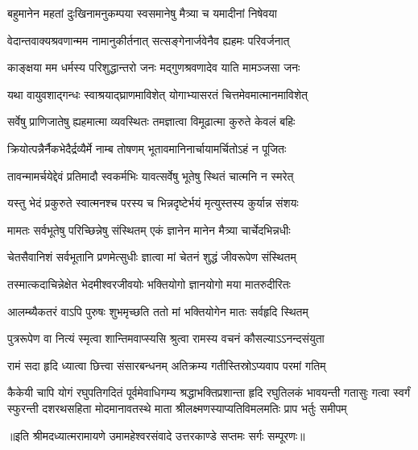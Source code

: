 \twolineshloka
{बहुमानेन महतां दुःखिनामनुकम्पया}
{स्वसमानेषु मैत्र्या च यमादीनां निषेवया} %

\twolineshloka
{वेदान्तवाक्यश्रवणान्मम नामानुकीर्तनात्}
{सत्सङ्गेनार्जवेनैव ह्यहमः परिवर्जनात्} %

\twolineshloka
{काङ्क्षया मम धर्मस्य परिशुद्धान्तरो जनः}
{मद्गुणश्रवणादेव याति मामञ्जसा जनः} %

\twolineshloka
{यथा वायुवशाद्गन्धः स्वाश्रयाद्\mbox{}घ्राणमाविशेत्}
{योगाभ्यासरतं चित्तमेवमात्मानमाविशेत्} %

\twolineshloka
{सर्वेषु प्राणिजातेषु ह्यहमात्मा व्यवस्थितः}
{तमज्ञात्वा विमूढात्मा कुरुते केवलं बहिः} %

\twolineshloka
{क्रियोत्पन्नैर्नैकभेदैर्द्रव्यैर्मे नाम्ब तोषणम्}
{भूतावमानिनार्चायामर्चितोऽहं न पूजितः} %

\twolineshloka
{तावन्मामर्चयेद्देवं प्रतिमादौ स्वकर्मभिः}
{यावत्सर्वेषु भूतेषु स्थितं चात्मनि न स्मरेत्} %

\twolineshloka
{यस्तु भेदं प्रकुरुते स्वात्मनश्च परस्य च}
{भिन्नदृष्टेर्भयं मृत्युस्तस्य कुर्यान्न संशयः} %

\twolineshloka
{मामतः सर्वभूतेषु परिच्छिन्नेषु संस्थितम्}
{एकं ज्ञानेन मानेन मैत्र्या चार्चेदभिन्नधीः} %

\twolineshloka
{चेतसैवानिशं सर्वभूतानि प्रणमेत्सुधीः}
{ज्ञात्वा मां चेतनं शुद्धं जीवरूपेण संस्थितम्} %

\twolineshloka
{तस्मात्कदाचिन्नेक्षेत भेदमीश्वरजीवयोः}
{भक्तियोगो ज्ञानयोगो मया मातरुदीरितः} %

\twolineshloka
{आलम्ब्यैकतरं वाऽपि पुरुषः शुभमृच्छति}
{ततो मां भक्तियोगेन मातः सर्वहृदि स्थितम्} %

\twolineshloka
{पुत्ररूपेण वा नित्यं स्मृत्वा शान्तिमवाप्स्यसि}
{श्रुत्वा रामस्य वचनं कौसल्याऽऽनन्दसंयुता} %

\twolineshloka
{रामं सदा हृदि ध्यात्वा छित्त्वा संसारबन्धनम्}
{अतिक्रम्य गतीस्तिस्रोऽप्यवाप परमां गतिम्} %

\setlength{\shlokaspaceskip}{10pt}
\fourlineindentedshloka
{कैकेयी चापि योगं रघुपतिगदितं पूर्वमेवाधिगम्य}
{श्रद्धाभक्तिप्रशान्ता हृदि रघुतिलकं भावयन्ती गतासुः}
{गत्वा स्वर्गं स्फुरन्ती दशरथसहिता मोदमानावतस्थे}
{माता श्रीलक्ष्मणस्याप्यतिविमलमतिः प्राप भर्तुः समीपम्} %
\setlength{\shlokaspaceskip}{24pt}

{॥इति श्रीमदध्यात्मरामायणे उमामहेश्वरसंवादे उत्तरकाण्डे सप्तमः
सर्गः सम्पूरणः॥}
